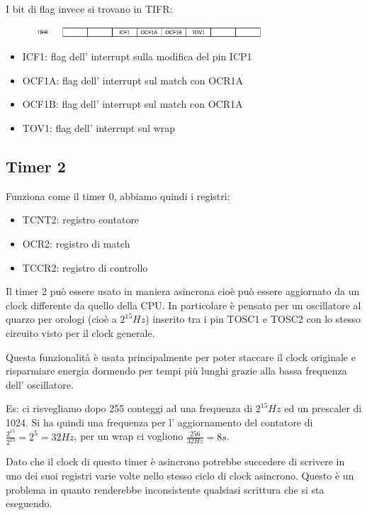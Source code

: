 I bit di flag invece si trovano in TIFR:
\begin{figure}[H]
    \centering
    \includegraphics[width=320px]{images/18_Timer/TIFR_1.png}
\end{figure}
\begin{itemize}
    \item ICF1: flag dell' interrupt sulla modifica del pin ICP1
    \item OCF1A: flag dell' interrupt sul match con OCR1A
    \item OCF1B: flag dell' interrupt sul match con OCR1A 
    \item TOV1: flag dell' interrupt sul wrap
\end{itemize}

\subsection{Timer 2}
Funziona come il timer 0, abbiamo quindi i registri:
\begin{itemize}
    \item TCNT2: registro contatore
    \item OCR2: registro di match 
    \item TCCR2: registro di controllo
\end{itemize}

Il timer 2 può essere usato in maniera asincrona cioè può essere aggiornato da un clock differente da quello della CPU.
In particolare è pensato per un oscillatore al quarzo per orologi (cioè a $2^{15}Hz$) inserito tra i pin TOSC1 e TOSC2 con lo stesso circuito visto per il clock generale.

Questa funzionalità è usata principalmente per poter staccare il clock originale e risparmiare energia dormendo per tempi più lunghi grazie alla bassa frequenza dell' oscillatore.

Es: ci risvegliamo dopo 255 conteggi ad una frequenza di $2^{15}Hz$ ed un prescaler di 1024. Si ha quindi una frequenza per l' aggiornamento del contatore di $\frac{2^{15}}{2^{10}} = 2^{5} = 32Hz$, per un wrap ci vogliono $\frac{256}{32Hz} = 8s$.

Dato che il clock di questo timer è asincrono potrebbe succedere di scrivere in uno dei suoi registri varie volte nello stesso ciclo di clock asincrono.
Questo è un problema in quanto renderebbe inconsistente qualsiasi scrittura che si sta eseguendo.

